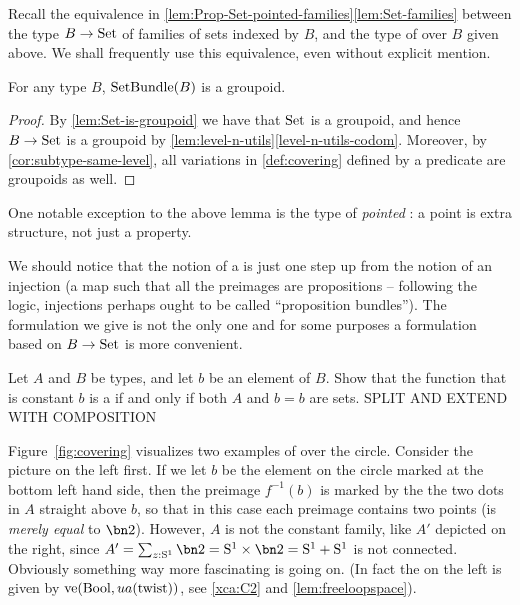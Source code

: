 Recall the equivalence in \cref{lem:Prop-Set-pointed-families}\ref{lem:Set-families}
between the type $B\to\mathrm{Set}$ of families of sets indexed by $B$, and the type
of \coverings over $B$ given above.
We shall frequently use this equivalence, even without explicit mention.

\begin{lemma}\label{lem:setbundle-is-groupoid}
For any type $B$, $\mathrm{SetBundle}(B)$ is a groupoid.
\end{lemma}
\begin{proof}
By \cref{lem:Set-is-groupoid} we have that $\mathrm{Set}$ is a groupoid, 
and hence $B\to\mathrm{Set}$ is a groupoid by \cref{lem:level-n-utils}\ref{level-n-utils-codom}.
Moreover, by \cref{cor:subtype-same-level}, all variations in \cref{def:covering}
defined by a predicate are groupoids as well.
\end{proof}
One notable exception to the above lemma is the type of \emph{pointed} \coverings:
a point is extra structure, not just a property.

We should notice that the notion of a \covering is just one step up from the notion of an
injection (a map such that all the preimages are propositions -- 
following the logic, injections perhaps ought to be called ``proposition bundles''). 
The formulation we give is not the only one and for some purposes a formulation
based on $B\to\mathrm{Set}$ is more convenient.

\begin{xca}\label{xca:constant-cover}
Let $A$ and $B$ be types, and let $b$ be an element of $B$.
Show that the function that is constant $b$ is a \covering
if and only if both $A$ and $b=b$ are sets. SPLIT AND EXTEND WITH COMPOSITION
\end{xca}

Figure~\ref{fig:covering} visualizes two examples of \coverings over the circle.  
Consider the picture on the left first.  
If we let $b$ be the element on the circle marked at the bottom left hand side, 
then the preimage $f^{-1}(b)$ is marked by the the two dots in $A$ straight above $b$, 
so that in this case each preimage contains two points (is \emph{merely equal} to $\bn 2$).  
However, $A$ is not the constant family, like $A'$ depicted on the right, since 
$A'=\sum_{z:\Sc}\bn 2=\Sc\times\bn 2=\Sc+\Sc$ is not connected.  
Obviously something way more fascinating is going on.
(In fact the \covering on the left is given by $\ve(\bool,ua(\twist))$,
see \cref{xca:C2} and \cref{lem:freeloopspace}).

